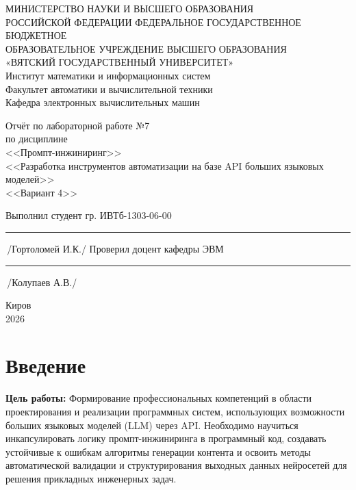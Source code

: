 \documentclass[oneside,a4paper,14pt]{extarticle} %
\begin{document}
	\newpage\thispagestyle{empty}
	\begin{center}
		МИНИСТЕРСТВО НАУКИ И ВЫСШЕГО ОБРАЗОВАНИЯ\\
			РОССИЙСКОЙ ФЕДЕРАЦИИ
			ФЕДЕРАЛЬНОЕ ГОСУДАРСТВЕННОЕ БЮДЖЕТНОЕ\\
			ОБРАЗОВАТЕЛЬНОЕ
			УЧРЕЖДЕНИЕ ВЫСШЕГО ОБРАЗОВАНИЯ\\
			«ВЯТСКИЙ ГОСУДАРСТВЕННЫЙ УНИВЕРСИТЕТ»\\
			Институт математики и информационных систем\\
			Факультет автоматики и вычислительной техники\\
			Кафедра электронных вычислительных машин
	\end{center}
	\vspace{20mm}

	\begin{center}
		Отчёт по лабораторной работе №7\\
		по дисциплине\\
		<<Промпт-инжиниринг>>\\
		<<Разработка инструментов автоматизации на базе API больших языковых моделей>>\\
		<<Вариант 4>>\\
	\end{center}
	\vspace{48mm}

	\noindent
	Выполнил студент гр. ИВТб-1303-06-00 \hfill \rule[-0,5mm]{30mm}{0.15mm}\,/Гортоломей И.К./
	\newline
	Проверил доцент кафедры ЭВМ \hfill \rule[-0,5mm]{30mm}{0.15mm}\,/Колупаев А.В./

	\vfill
	\begin{center}
		Киров\\
		2026
	\end{center}

	\newpage
	\thispagestyle{empty}

\section*{Введение}
\noindent
\textbf{Цель работы:} Формирование профессиональных компетенций в области проектирования и реализации программных систем, использующих возможности больших языковых моделей (LLM) через API. Необходимо научиться инкапсулировать логику промпт-инжиниринга в программный код, создавать устойчивые к ошибкам алгоритмы генерации контента и освоить методы автоматической валидации и структурирования выходных данных нейросетей для решения прикладных инженерных задач.
\end{document}
